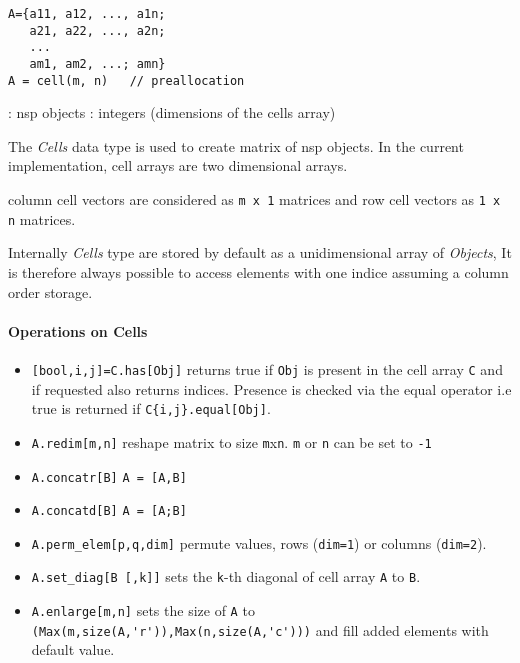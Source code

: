 
\begin{mandesc}
\end{mandesc}
\begin{calling_sequence}
\begin{verbatim}
A={a11, a12, ..., a1n;
   a21, a22, ..., a2n;
   ...
   am1, am2, ...; amn}
A = cell(m, n)   // preallocation
\end{verbatim}
\end{calling_sequence}
\begin{parameters}
  \begin{varlist}
    : nsp objects
    : integers (dimensions of the cells array)
  \end{varlist}
\end{parameters}

\begin{mandescription}

The \emph{Cells} data type is used to create matrix of nsp objects. 
In the current implementation, cell arrays are two dimensional arrays. 

column cell vectors are considered as \verb!m x 1! matrices and row cell vectors
as \verb!1 x n! matrices.

Internally \emph{Cells} type are stored by default as a unidimensional array of \emph{Objects},
It is therefore always possible to access elements with one indice assuming a column order 
storage. 
\end{mandescription}

\paragraph{Operations on Cells}
\begin{itemize}
\item \verb+[bool,i,j]=C.has[Obj]+ returns true if \verb+Obj+ is present in the cell array \verb+C+ and if requested also returns indices. Presence is checked via the equal operator i.e 
true is returned if \verb+C{i,j}.equal[Obj]+.
\end{itemize}
\begin{itemize}
\item \verb+A.redim[m,n]+ reshape matrix to size \verb+m+x\verb+n+. \verb+m+ or \verb+n+ can be set to \verb+-1+ 
\item \verb+A.concatr[B]+ \verb+A = [A,B]+
\item \verb+A.concatd[B]+ \verb+A = [A;B]+
\item \verb+A.perm_elem[p,q,dim]+ permute values, rows (\verb+dim=1+) or columns (\verb+dim=2+).
\item \verb+A.set_diag[B [,k]]+ sets the \verb+k+-th diagonal of cell array \verb+A+ to \verb+B+.
\item \verb+A.enlarge[m,n]+ sets the size of \verb+A+ to \verb+(Max(m,size(A,'r')),Max(n,size(A,'c')))+ and fill 
  added elements with default value.
\end{itemize}

